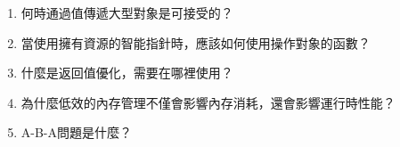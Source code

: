 \begin{enumerate}
\item 
何時通過值傳遞大型對象是可接受的？

\item 
當使用擁有資源的智能指針時，應該如何使用操作對象的函數？

\item 
什麼是返回值優化，需要在哪裡使用？

\item
為什麼低效的內存管理不僅會影響內存消耗，還會影響運行時性能？

\item 
A-B-A問題是什麼？

\end{enumerate}